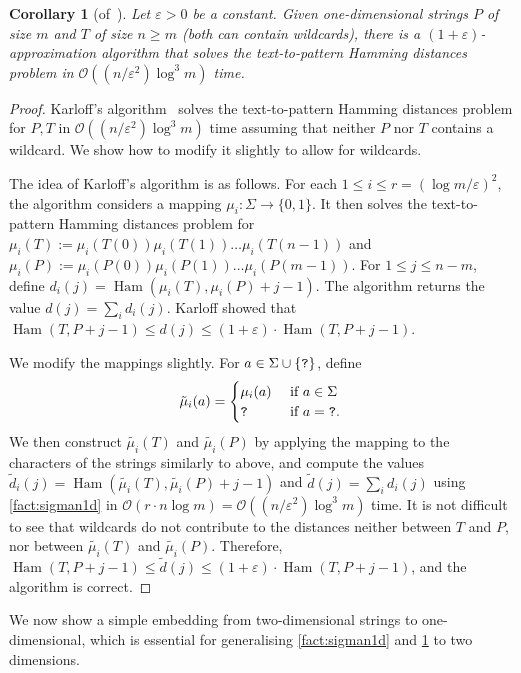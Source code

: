 \documentclass[a4paper,11pt]{article}
\newtheorem{corollary}{Corollary}[section]
\renewcommand{\O}{\mathcal{O}}
\DeclareMathOperator*{\Ham}{Ham}
\begin{document}
\begin{corollary}[of~\cite{Karloff1993}]\label{cor:approx1d}
Let $\varepsilon > 0$ be a constant. Given one-dimensional strings $P$ of size $m$ and $T$ of size $n \ge m$ (both can contain wildcards), there is a $(1+\varepsilon)$-approximation algorithm that solves the text-to-pattern Hamming distances problem in $\O((n/\varepsilon^2)  \log^3 m)$ time.
\end{corollary}
\begin{proof}
Karloff's algorithm~\cite{Karloff1993} solves the text-to-pattern Hamming distances problem for $P,T$ in $\O((n/\varepsilon^2)  \log^3 m)$ time assuming that neither $P$ nor $T$ contains a wildcard. We show how to modify it slightly to allow for wildcards. 

The idea of Karloff's algorithm is as follows. For each $1 \le i \le r = (\log m/ \varepsilon)^2$, the algorithm considers a mapping $\mu_i : \Sigma \rightarrow \{0,1\}$. It then solves the text-to-pattern Hamming distances problem for $\mu_i(T) := \mu_i(T(0))\mu_i(T(1)) \ldots \mu_i(T(n-1))$ and $\mu_i(P) := \mu_i(P(0))\mu_i(P(1)) \ldots \mu_i(P(m-1))$. For $1 \le j \le n-m$, define $d_i(j) = \Ham(\mu_i(T), \mu_i(P)+j-1)$. The algorithm returns the value $d(j) = \sum_i d_i(j)$. Karloff showed that $\Ham(T, P+j-1) \le d(j) \le (1+\varepsilon) \cdot \Ham(T, P+j-1)$.

We modify the mappings slightly. For $a \in \Sigma \cup \{\texttt{?}\}$, define
$$
\tilde{\mu}_i(a) = 
\begin{cases}
\mu_i(a) &\text{ if } a \in \Sigma\\
\texttt{?} & \text{ if } a = \texttt{?}.
\end{cases}
$$
We then construct $\tilde{\mu_i}(T)$ and $\tilde{\mu_i}(P)$ by applying the mapping to the characters of the strings similarly to above, and compute the values $\tilde{d}_i(j) = \Ham(\tilde{\mu_i}(T), \tilde{\mu_i}(P)+j-1)$ and $\tilde{d}(j) = \sum_i d_i(j)$ using \cref{fact:sigman1d} in $\O(r \cdot n \log m) = \O((n/\varepsilon^2) \log^3 m)$ time. It is not difficult to see that wildcards do not contribute to the distances neither between $T$ and $P$, nor between $\tilde{\mu_i}(T)$ and $\tilde{\mu_i}(P)$. Therefore, $\Ham(T, P+j-1) \le \tilde{d}(j) \le (1+\varepsilon) \cdot \Ham(T, P+j-1)$, and the algorithm is correct. 
\end{proof}

We now show a simple embedding from two-dimensional strings to one-dimensional, which is essential for generalising \cref{fact:sigman1d} and \cref{cor:approx1d} to two dimensions.
\end{document}
